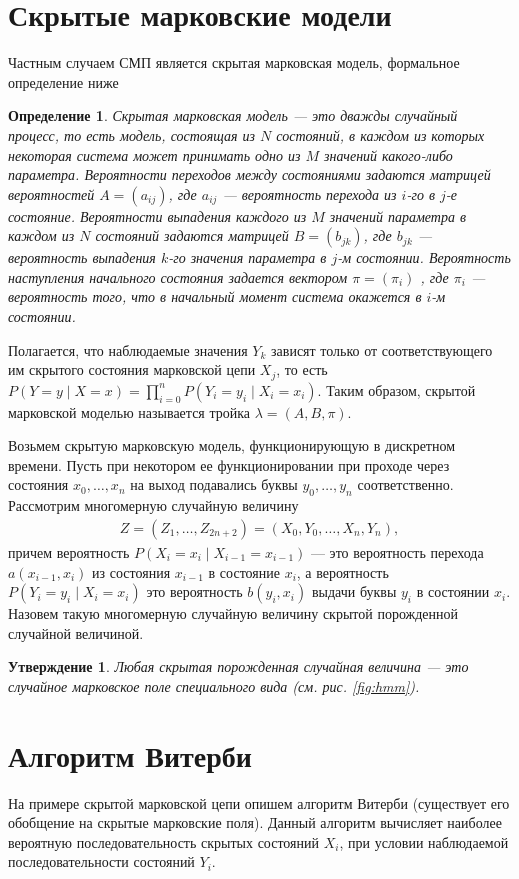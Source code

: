 \documentclass[12pt]{article}
\newtheorem{dfn}{Определение}
\newtheorem{utv}{Утверждение}
\begin{document}
\section{Скрытые марковские модели}
Частным случаем СМП является скрытая марковская модель, формальное определение ниже
\begin{dfn}
Скрытая марковская модель --- это дважды случайный процесс, то есть модель, состоящая из $N$ состояний,
в каждом из которых некоторая система может принимать одно из
$M$ значений какого-либо параметра. Вероятности переходов между
состояниями задаются матрицей вероятностей $A = (a_{ij})$, где $a_{ij}$ — вероятность перехода из $i$-го в $j$-е состояние. Вероятности выпадения каждого из $M$ значений параметра в каждом из $N$ состояний
задаются матрицей $B = (b_{jk})$, где $b_{jk}$ — вероятность выпадения $k$-го
значения параметра в $j$-м состоянии. Вероятность наступления начального состояния задается вектором $\pi = (\pi_i)$ , где $\pi_i$ --- вероятность
того, что в начальный момент система окажется в $i$-м состоянии.
\end{dfn}

Полагается, что наблюдаемые значения $Y_k$ зависят только от соответствующего им скрытого состояния марковской цепи $X_j$, то есть $P(Y = y \mid X = x) = \prod\limits_{i = 0}^{n} P(Y_i = y_i \mid X_i = x_i)$. Таким образом, скрытой
марковской моделью называется тройка $\lambda = (A, B, \pi)$.

Возьмем скрытую марковскую модель, функционирующую в дискретном времени. Пусть при некотором ее функционировании при проходе через состояния $x_0, \ldots, x_n$ на выход подавались буквы $y_0, \ldots, y_n$ соответственно. Рассмотрим многомерную случайную
величину
\begin{gather*}
Z = (Z_1, \ldots, Z_{2n + 2}) = (X_0, Y_0, \ldots, X_n, Y_n),
\end{gather*}
причем вероятность $P(X_i = x_i \mid X_{i-1} = x_{i-1})$ --- это вероятность перехода $a(x_{i-1}, x_{i})$ из состояния $x_{i-1}$ в состояние $x_i$, а вероятность $P(Y_i  = y_i \mid X_i = x_i)$ это вероятность $b(y_i, x_i)$ выдачи буквы $y_i$ в состоянии $x_i$. Назовем такую многомерную случайную величину скрытой порожденной случайной величиной.


\begin{utv}
Любая скрытая порожденная случайная величина — это случайное марковское поле специального вида (см. рис. \ref{fig:hmm}).
\end{utv}
\section{Алгоритм Витерби}
На примере скрытой марковской цепи опишем алгоритм Витерби (существует его обобщение на скрытые марковские поля).
Данный алгоритм вычисляет наиболее вероятную последовательность скрытых состояний $X_i$, при условии наблюдаемой последовательности состояний $Y_i$. 
\end{document}
